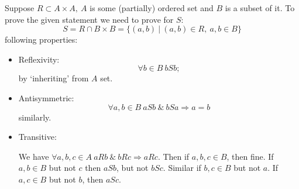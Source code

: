 \documentclass[12pt]{report}
\begin{document}
    \begin{solution}
        Suppose $R \subset A \times A, \ A$ is some (partially) ordered set and $B$ is a subset of it. To prove the given statement we need to prove for $S$:
        \[
            S = R \cap B \times B = \{(a, b) \ | \ (a,b) \in R, \ a, b\in B\}  
        \]
        following properties:
        \begin{itemize}
            \item Reflexivity:
            \[
                \forall b \in B \ bSb;
            \]
            by `inheriting'   from $A$ set.
            \item Antisymmetric:
            \[
                \forall a, b \in B \ aSb \ \&\ bSa \Longrightarrow a = b
            \]
            similarly.
            \item Transitive:
            \par
            We have $\forall a,b,c \in A\ aRb\ \&\ bRc \Longrightarrow aRc$. Then if $a,b,c \in B$, then fine. If $a,b\in B$ but not $c$ then $aSb$, but not $bSc$. Similar if $b, c \in B$ but not $a$. If $a, c \in B$ but not $b$, then $aSc$.
        \end{itemize}
    \end{solution}
\end{document}
